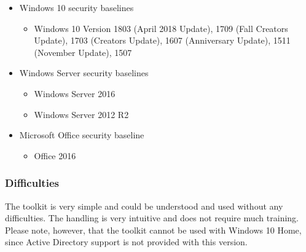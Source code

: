 \begin{itemize}
    \item Windows 10 security baselines
    \begin{itemize}
        \item Windows 10 Version 1803 (April 2018 Update), 1709 (Fall Creators Update), 1703 (Creators Update), 1607 (Anniversary Update), 1511 (November Update), 1507
    \end{itemize}
    \item Windows Server security baselines
    \begin{itemize}
        \item Windows Server 2016
        \item Windows Server 2012 R2
    \end{itemize}
    \item Microsoft Office security baseline
    \begin{itemize}
        \item Office 2016
    \end{itemize}
\end{itemize}

\subsubsection{Difficulties}
The toolkit is very simple and could be understood and used without any difficulties. The handling is very intuitive and does not require much training. Please note, however, that the toolkit cannot be used with Windows 10 Home, since Active Directory support is not provided with this version.

